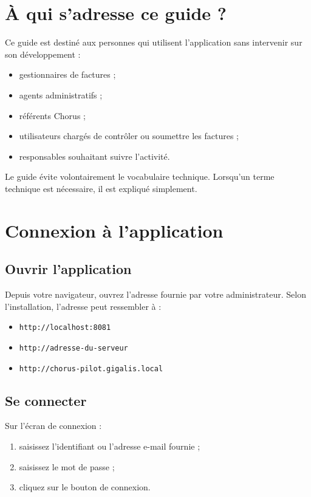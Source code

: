 \documentclass[11pt,a4paper]{article}
\begin{document}
\section{À qui s'adresse ce guide ?}

Ce guide est destiné aux personnes qui utilisent l'application sans intervenir
sur son développement :

\begin{itemize}
  \item gestionnaires de factures ;
  \item agents administratifs ;
  \item référents Chorus ;
  \item utilisateurs chargés de contrôler ou soumettre les factures ;
  \item responsables souhaitant suivre l'activité.
\end{itemize}

Le guide évite volontairement le vocabulaire technique. Lorsqu'un terme
technique est nécessaire, il est expliqué simplement.

\section{Connexion à l'application}

\subsection{Ouvrir l'application}

Depuis votre navigateur, ouvrez l'adresse fournie par votre administrateur.
Selon l'installation, l'adresse peut ressembler à :

\begin{itemize}
  \item \texttt{http://localhost:8081}
  \item \texttt{http://adresse-du-serveur}
  \item \texttt{http://chorus-pilot.gigalis.local}
\end{itemize}

\subsection{Se connecter}

Sur l'écran de connexion :

\begin{enumerate}
  \item saisissez l'identifiant ou l'adresse e-mail fournie ;
  \item saisissez le mot de passe ;
  \item cliquez sur le bouton de connexion.
\end{enumerate}
\end{document}
